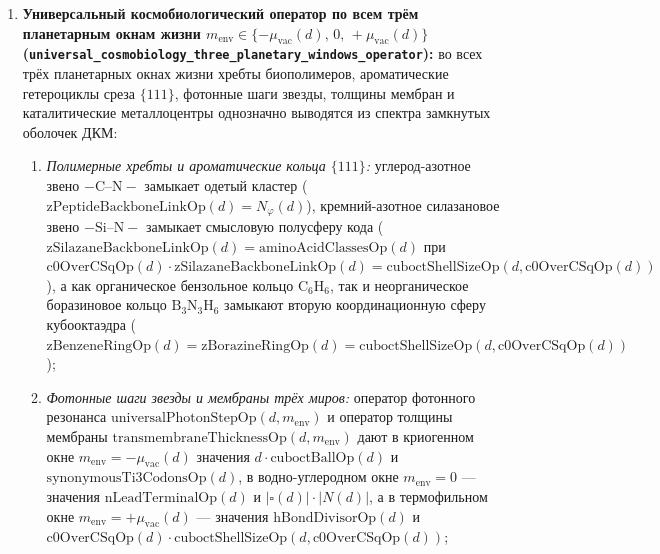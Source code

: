 \begin{theorem}
\begin{enumerate}[label=\textbf{(\roman*)},leftmargin=*]
  \[
    \mathrm{allometryExponentRatioOp}(d,d) = \bigl(\mathrm{c0OverCSqOp}(d),d\bigr),\qquad
    \mathrm{allometryExponentRatioOp}\bigl(d,d_{\mathrm{in}}(\square)\bigr) = \bigl(d,d_{\mathrm{in}}(\square)\bigr),
  \]
  \[
    \mathrm{allometryExponentRatioOp}\bigl(d,d_{\mathrm{out}}(E)(d)\bigr) = \bigl(d_{\mathrm{in}}(\square),d_{\mathrm{out}}(E)(d)\bigr),
  \]
  \[
    \mathrm{corticalLongevityMultiplierOp}\bigl(d,\mu_{\mathrm{vac}}(d),0,0\bigr) = \mu_{\mathrm{vac}}(d),\qquad
    \mathrm{corticalLongevityMultiplierOp}\bigl(d,\mu_{\mathrm{vac}}(d),\mu_{\mathrm{vac}}(d),0\bigr) = d.
  \]
\item \textbf{Универсальный космобиологический оператор по всем трём планетарным окнам жизни $m_{\mathrm{env}}\in\{-\mu_{\mathrm{vac}}(d),\,0,\,+\mu_{\mathrm{vac}}(d)\}$ (\texttt{universal\_cosmobiology\_three\_planetary\_windows\_operator}):}
  во всех трёх планетарных окнах жизни хребты биополимеров, ароматические гетероциклы среза $\{111\}$, фотонные шаги звезды, толщины мембран и каталитические металлоцентры однозначно выводятся из спектра замкнутых оболочек ДКМ:
  \begin{enumerate}[label=\textbf{(\alph*)},leftmargin=*,noitemsep]
  \item \emph{Полимерные хребты и ароматические кольца $\{111\}$:} углерод-азотное звено $-\mathrm{C\text{--}N}-$ замыкает одетый кластер ($\mathrm{zPeptideBackboneLinkOp}(d) = N_\varphi(d)$), кремний-азотное силазановое звено $-\mathrm{Si\text{--}N}-$ замыкает смысловую полусферу кода ($\mathrm{zSilazaneBackboneLinkOp}(d) = \mathrm{aminoAcidClassesOp}(d)$ при $\mathrm{c0OverCSqOp}(d)\cdot\mathrm{zSilazaneBackboneLinkOp}(d) = \mathrm{cuboctShellSizeOp}(d,\mathrm{c0OverCSqOp}(d))$), а как органическое бензольное кольцо $\mathrm{C_6H_6}$, так и неорганическое боразиновое кольцо $\mathrm{B_3N_3H_6}$ замыкают вторую координационную сферу кубооктаэдра ($\mathrm{zBenzeneRingOp}(d) = \mathrm{zBorazineRingOp}(d) = \mathrm{cuboctShellSizeOp}(d,\mathrm{c0OverCSqOp}(d))$);
  \item \emph{Фотонные шаги звезды и мембраны трёх миров:} оператор фотонного резонанса $\mathrm{universalPhotonStepOp}(d,m_{\mathrm{env}})$ и оператор толщины мембраны $\mathrm{transmembraneThicknessOp}(d,m_{\mathrm{env}})$ дают в криогенном окне $m_{\mathrm{env}}=-\mu_{\mathrm{vac}}(d)$ значения $d\cdot\mathrm{cuboctBallOp}(d)$ и $\mathrm{synonymousTi3CodonsOp}(d)$, в водно-углеродном окне $m_{\mathrm{env}}=0$ --- значения $\mathrm{nLeadTerminalOp}(d)$ и $|\square(d)|\cdot |N(d)|$, а в термофильном окне $m_{\mathrm{env}}=+\mu_{\mathrm{vac}}(d)$ --- значения $\mathrm{hBondDivisorOp}(d)$ и $\mathrm{c0OverCSqOp}(d)\cdot\mathrm{cuboctShellSizeOp}(d,\mathrm{c0OverCSqOp}(d))$;

\end{enumerate}
\end{enumerate}
\end{theorem}
